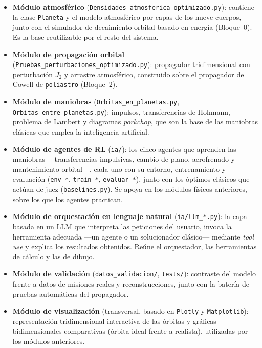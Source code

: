 \begin{itemize}
  \item \textbf{Módulo atmosférico}
        (\texttt{Densidades\_atmosferica\_optimizado.py}): contiene la clase \texttt{Planeta} y el modelo atmosférico por capas de los nueve cuerpos, junto con el simulador de decaimiento orbital basado en energía (Bloque~0). Es la base reutilizable por el resto del sistema.
  \item \textbf{Módulo de propagación orbital}
        (\texttt{Pruebas\_perturbaciones\_optimizado.py}): propagador tridimensional con perturbación $J_2$ y arrastre atmosférico, construido sobre el propagador de Cowell de \texttt{poliastro} (Bloque~2).
  \item \textbf{Módulo de maniobras} (\texttt{Orbitas\_en\_planetas.py},
        \texttt{Orbitas\_entre\_planetas.py}): impulsos, transferencias de Hohmann, problema de Lambert y diagramas \textit{porkchop}, que son la base de las maniobras clásicas que emplea la inteligencia artificial.
  \item \textbf{Módulo de agentes de \gls{RL}} (\texttt{ia/}): los cinco agentes que aprenden las maniobras ---transferencias impulsivas, cambio de plano, aerofrenado y mantenimiento orbital---, cada uno con su entorno, entrenamiento y evaluación (\texttt{env\_*}, \texttt{train\_*}, \texttt{evaluar\_*}), junto con los óptimos clásicos que actúan de juez (\texttt{baselines.py}). Se apoya en los módulos físicos anteriores, sobre los que los agentes practican.
  \item \textbf{Módulo de orquestación en lenguaje natural} (\texttt{ia/llm\_*.py}): la capa basada en un \gls{LLM} que interpreta las peticiones del usuario, invoca la herramienta adecuada ---un agente o un solucionador clásico--- mediante \textit{tool use} y explica los resultados obtenidos. Reúne el orquestador, las herramientas de cálculo y las de dibujo.
  \item \textbf{Módulo de validación} (\texttt{datos\_validacion/}, \texttt{tests/}): contraste del modelo frente a datos de misiones reales y reconstrucciones, junto con la batería de pruebas automáticas del propagador.
  \item \textbf{Módulo de visualización} (transversal, basado en \texttt{Plotly} y \texttt{Matplotlib}): representación tridimensional interactiva de las órbitas y gráficas bidimensionales comparativas (órbita ideal frente a realista), utilizadas por los módulos anteriores.
\end{itemize}

